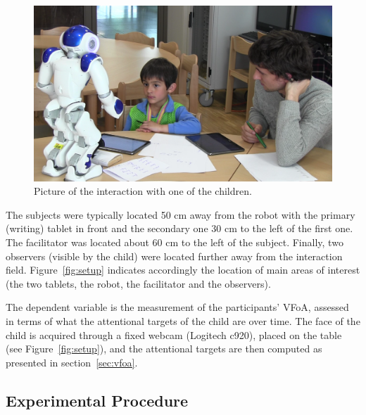 \documentclass{sig-alternate}
\begin{document}
\begin{figure}[h!]
    \centering
    \includegraphics[width=1\columnwidth]{realSetup}
    \caption{\small Picture of the interaction with one of the children.}
    \label{fig:realSetup}
\end{figure}

The subjects were typically located 50 cm away from the robot with the primary
(writing) tablet in front and the secondary one 30 cm to the left of the first
one.  The facilitator was located about 60 cm to the left of the subject.
Finally, two observers (visible by the child) were located further away from the
interaction field.  Figure~\ref{fig:setup} indicates accordingly the location of
main areas of interest (the two tablets, the robot, the facilitator and the
observers).


The dependent variable is the measurement of the participants' VFoA, assessed in
terms of what the attentional targets of the child are over time. The face of
the child is acquired through a fixed webcam (Logitech {\sf c920}), placed on
the table (see Figure~\ref{fig:setup}), and the attentional targets are then
computed as presented in section~\ref{sec:vfoa}.


\subsection{Experimental Procedure}
\end{document}
